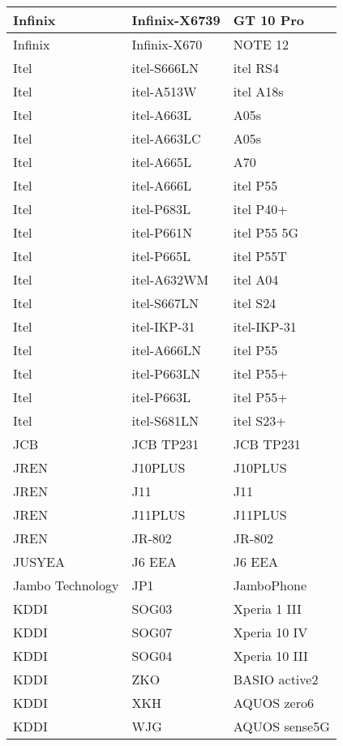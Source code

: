 \begin{tabularx}{\linewidth}{|l|X|X|}
        Infinix & Infinix-X6739 & GT 10 Pro \\ \hline
        Infinix & Infinix-X670 & NOTE 12 \\ \hline
        Itel & itel-S666LN & itel RS4 \\ \hline
        Itel & itel-A513W & itel A18s \\ \hline
        Itel & itel-A663L & A05s \\ \hline
        Itel & itel-A663LC & A05s \\ \hline
        Itel & itel-A665L & A70 \\ \hline
        Itel & itel-A666L & itel P55 \\ \hline
        Itel & itel-P683L & itel P40+ \\ \hline
        Itel & itel-P661N & itel P55 5G \\ \hline
        Itel & itel-P665L & itel P55T \\ \hline
        Itel & itel-A632WM & itel A04 \\ \hline
        Itel & itel-S667LN & itel S24 \\ \hline
        Itel & itel-IKP-31 & itel-IKP-31 \\ \hline
        Itel & itel-A666LN & itel P55 \\ \hline
        Itel & itel-P663LN & itel P55+ \\ \hline
        Itel & itel-P663L & itel P55+ \\ \hline
        Itel & itel-S681LN & itel S23+ \\ \hline
        JCB & JCB TP231 & JCB TP231 \\ \hline
        JREN & J10PLUS & J10PLUS \\ \hline
        JREN & J11 & J11 \\ \hline
        JREN & J11PLUS & J11PLUS \\ \hline
        JREN & JR-802 & JR-802 \\ \hline
        JUSYEA & J6 EEA & J6 EEA \\ \hline
        Jambo Technology & JP1 & JamboPhone \\ \hline
        KDDI & SOG03 & Xperia 1 III \\ \hline
        KDDI & SOG07 & Xperia 10 IV \\ \hline
        KDDI & SOG04 & Xperia 10 III \\ \hline
        KDDI & ZKO & BASIO active2 \\ \hline
        KDDI & XKH & AQUOS zero6 \\ \hline
        KDDI & WJG & AQUOS sense5G \\ \hline

\end{tabularx}
